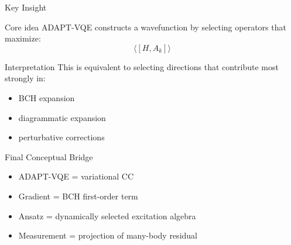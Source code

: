 \documentclass{beamer}
\begin{document}

\begin{frame}{Key Insight}
\begin{block}{Core idea}
ADAPT-VQE constructs a wavefunction by selecting operators that maximize:
\[
\langle [H,A_k] \rangle
\]
\end{block}

\begin{block}{Interpretation}
This is equivalent to selecting directions that contribute most strongly in:
\begin{itemize}
\item BCH expansion
\item diagrammatic expansion
\item perturbative corrections
\end{itemize}
\end{block}
\end{frame}


\begin{frame}{Final Conceptual Bridge}
\begin{itemize}
\item ADAPT-VQE = variational CC
\item Gradient = BCH first-order term
\item Ansatz = dynamically selected excitation algebra
\item Measurement = projection of many-body residual
\end{itemize}
\end{frame}
\end{document}
